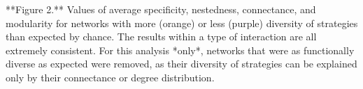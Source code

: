 **Figure 2.** Values of average specificity, nestedness, connectance, and
modularity for networks with more (orange) or less (purple) diversity of
strategies than expected by chance. The results within a type of interaction
are all extremely consistent. For this analysis *only*, networks that were
as functionally diverse as expected were removed, as their diversity of
strategies can be explained only by their connectance or degree distribution.
